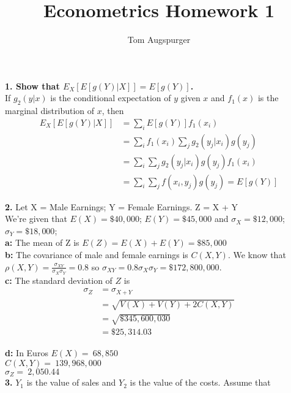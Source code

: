 \documentclass[11pt]{article}
\title{Econometrics Homework 1}
\author{Tom Augspurger}
\begin{document}
\maketitle

\textbf{1. Show that $E_{X}[E[g(Y)|X]] = E[g(Y)]$.}\\

If $g_{2}(y|x)$ is the conditional expectation of $y$ given $x$ and $f_{1}(x)$ is the marginal distribution of $x$, then
\begin{align*}
    E_{X}[E[g(Y)|X]] &= \sum_{i}E[g(Y)]f_{1}(x_{i})\\
    &= \sum_{i} f_{1}(x_{i})\sum_{j}g_{2}(y_{j}|x_{i})g(y_{j})\\
    &= \sum_{i} \sum_{j} g_{2}(y_{j}|x_{i})g(y_{j})f_{1}(x_{i})\\
    &= \sum_{i} \sum_{j} f(x_{i}, y_{j})g(y_{j}) = E[g(Y)]
\end{align*}

\textbf{2.} Let X = Male Earnings; Y = Female Earnings. Z = X + Y\\
We're given that
$E(X) = \$40,000$; $E(Y) = \$45,000$ and $\sigma_{X} = \$12,000$; $\sigma_{Y} = \$18,000$;\\

\textbf{a:} The mean of Z is $ E(Z) = E(X) + E(Y) = \$85,000$\\

\textbf{b:} The covariance of male and female earnings is $C(X, Y)$.  We know that
$
    \rho(X, Y) = \frac{\sigma_{XY}}{\sigma_{X}\sigma_{Y}} = 0.8
$ so $\sigma_{XY} = 0.8 \sigma_{X}\sigma_{Y} = \$172,800,000.$\\

\textbf{c:}  The standard deviation of $Z$ is 
    \begin{align*}
        \sigma_{Z} &= \sigma_{X + Y}\\
        &= \sqrt{V(X) + V(Y) + 2 C(X, Y)}\\
        &= \sqrt{\$345,600,030}\\
        &= \$ 25,314.03
    \end{align*}
    
\textbf{d:}  In Euros
$E(X) =\ $\EUR${68,850}$\\

$C(X,Y) =\ $\EUR${139,968,000}$\\

$\sigma_{Z} =\ $\EUR${2,050.44}$\\
    
\textbf{3.} $Y_{1}$ is the value of sales and $Y_{2}$ is the value of the costs. Assume that
\end{document}
